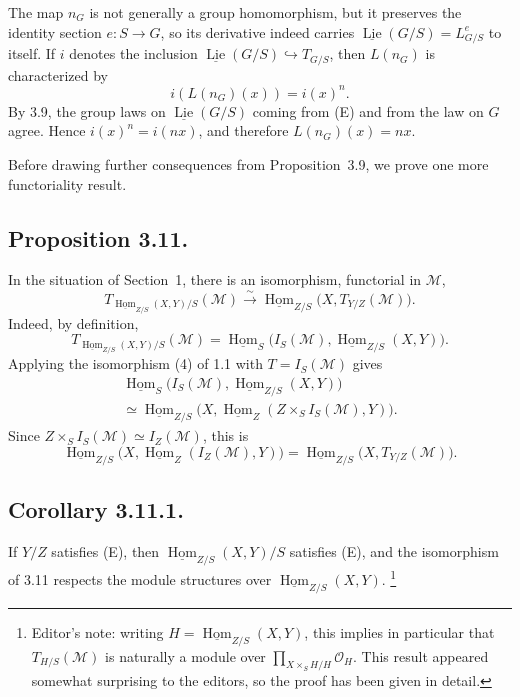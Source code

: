 The map \(n_G\) is not generally a group homomorphism, but it preserves
the identity section \(e:S\to G\), so its derivative indeed carries
\(\underline{\operatorname{Lie}}(G/S)=L^e_{G/S}\) to itself. If \(i\)
denotes the inclusion
\(\underline{\operatorname{Lie}}(G/S)\hookrightarrow T_{G/S}\), then
\(L(n_G)\) is characterized by
\[
  i(L(n_G)(x))=i(x)^n.
\]
By 3.9, the group laws on \(\underline{\operatorname{Lie}}(G/S)\) coming
from (E) and from the law on \(G\) agree. Hence
\(i(x)^n=i(nx)\), and therefore \(L(n_G)(x)=nx\).

Before drawing further consequences from Proposition~3.9, we prove one
more functoriality result.

\subsection*{Proposition 3.11.}
In the situation of Section~1, there is an isomorphism, functorial in
\(\mathcal M\),
\[
  T_{\underline{\operatorname{Hom}}_{Z/S}(X,Y)/S}(\mathcal M)
  \xrightarrow{\sim}
  \underline{\operatorname{Hom}}_{Z/S}
    \bigl(X,T_{Y/Z}(\mathcal M)\bigr).
\]
Indeed, by definition,
\[
  T_{\underline{\operatorname{Hom}}_{Z/S}(X,Y)/S}(\mathcal M)
  =\underline{\operatorname{Hom}}_S
    \bigl(I_S(\mathcal M),\underline{\operatorname{Hom}}_{Z/S}(X,Y)\bigr).
\]
Applying the isomorphism (4) of 1.1 with \(T=I_S(\mathcal M)\) gives
\begin{multline*}
  \underline{\operatorname{Hom}}_S
    \bigl(I_S(\mathcal M),\underline{\operatorname{Hom}}_{Z/S}(X,Y)\bigr)\\
  \simeq
  \underline{\operatorname{Hom}}_{Z/S}
    \bigl(X,\underline{\operatorname{Hom}}_Z
      (Z\times_SI_S(\mathcal M),Y)\bigr).
\end{multline*}
Since \(Z\times_SI_S(\mathcal M)\simeq I_Z(\mathcal M)\), this is
\[
  \underline{\operatorname{Hom}}_{Z/S}
    \bigl(X,\underline{\operatorname{Hom}}_Z(I_Z(\mathcal M),Y)\bigr)
  =\underline{\operatorname{Hom}}_{Z/S}
    \bigl(X,T_{Y/Z}(\mathcal M)\bigr).
\]

\subsection*{Corollary 3.11.1.}
If \(Y/Z\) satisfies (E), then
\(\underline{\operatorname{Hom}}_{Z/S}(X,Y)/S\) satisfies (E), and the
isomorphism of 3.11 respects the module structures over
\(\underline{\operatorname{Hom}}_{Z/S}(X,Y)\).
\footnote{Editor's note: writing
\(H=\underline{\operatorname{Hom}}_{Z/S}(X,Y)\), this implies in
particular that \(T_{H/S}(\mathcal M)\) is naturally a module over
\(\prod_{X\times_SH/H}\mathcal O_H\). This result appeared somewhat
surprising to the editors, so the proof has been given in detail.}

